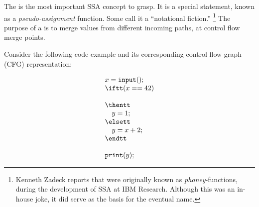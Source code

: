 The \phifun\index{\phifun} is the most important SSA concept to grasp.
It is a special statement, known as a
\textit{pseudo-assignment} function.
Some call it a ``notational fiction.''
\footnote{
%
%
Kenneth Zadeck reports that \phifuns were originally
known as \textit{phoney}-functions, during the development
of SSA at IBM Research. Although this was an in-house joke,
it did serve as the basis for the eventual name.
}
The purpose of a \phifun{} is to merge
values from different incoming paths, at control flow
merge points.

Consider the following code example and its corresponding control flow graph (CFG) representation:
\smallskip

\begin{minipage}{0.35\textwidth}%
\begin{equation*}
\begin{array}{l}
x = \texttt{input}();\\
\iftt (x == 42)\\
\\
\thentt\\
\quad    y = 1;\\
\elsett\\
\quad    y = x+2;\\
\endtt\\
\\
\texttt{print}(y);%
\end{array}%
\end{equation*}%
\end{minipage}
\begin{minipage}{0.5\textwidth}%
\strut
\end{minipage}
\bigskip


